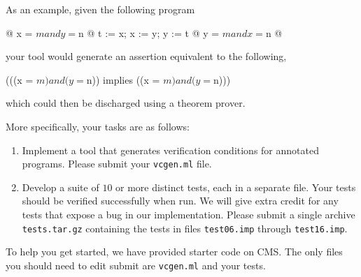\documentclass[11pt]{article}
\begin{document}
As an example, given the following program
\begin{progeg}
@ x = $m and y = $n @
 t := x; 
 x := y;
 y := t
@ y = $m and x = $n @
\end{progeg}
%
your tool would generate an assertion equivalent to the following,
%
\begin{progeg}
(((x = $m) and (y = $n)) implies ((x = $m) and (y = $n)))
\end{progeg}
%
which could then be discharged using a theorem prover.

More specifically, your tasks are as follows:
\begin{enumerate}
\item Implement a tool that generates verification conditions for
  annotated programs. Please submit your \texttt{vcgen.ml} file.
\item Develop a suite of $10$ or more distinct tests, each in a
  separate file. Your tests should be verified successfully when
  run. We will give extra credit for any tests that expose a bug in
  our implementation. Please submit a single archive
  \texttt{tests.tar.gz} containing the tests in files
  \texttt{test06.imp} through \texttt{test16.imp}.
\end{enumerate}

To help you get started, we have provided starter code on CMS. The
only files you should need to edit submit are \texttt{vcgen.ml} and
your tests.
\end{document}
